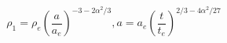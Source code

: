 \begin{equation}
\rho_1 = \rho_e\left(\frac{a}{a_e}\right)^{-3-2\alpha^2/3}
,a=a_e\left(\frac{t}{t_e}\right)^{2/3-4\alpha^2/27}
\end{equation}

